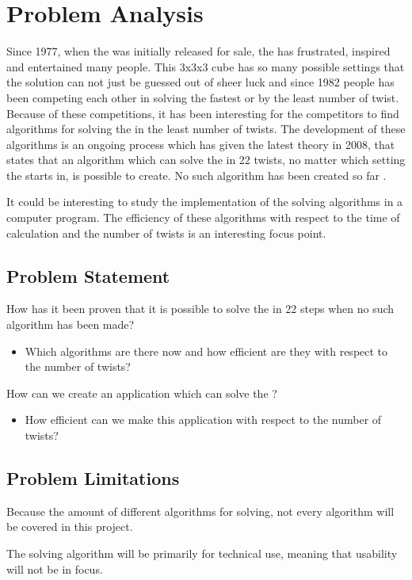 \chapter{Problem Analysis}
Since 1977, when the \rubik{} was initially released for sale, the \rubik{} has frustrated, inspired and entertained many people. This 3x3x3 cube has so many possible settings that the solution can not just be guessed out of sheer luck and since 1982 people has been competing each other in solving the \rubik{} fastest or by the least number of twist. Because of these competitions, it has been interesting for the competitors to find algorithms for solving the \rubik{} in the least number of twists. The development of these algorithms is an ongoing process which has given the latest theory in 2008, that states that an algorithm which can solve the \rubik{} in 22 twists, no matter which setting the \rubik{} starts in, is possible to create. No such algorithm has been created so far \cite{rokicki09}.

It could be interesting to study the implementation of the solving algorithms in a computer program. The efficiency of these algorithms with respect to the time of calculation and the number of twists is an interesting focus point.

\section{Problem Statement}
How has it been proven that it is possible to solve the \rubik{} in 22 steps when no such algorithm has been made?
\begin{itemize}
	\item Which algorithms are there now and how efficient are they with respect to the number of twists?
\end{itemize}
How can we create an application which can solve the \rubik{}?
\begin{itemize}
	\item How efficient can we make this application with respect to the number of twists?
\end{itemize}

\section{Problem Limitations}
Because the amount of different algorithms for \rubik{} solving, not every algorithm will be covered in this project.

The \rubik{} solving algorithm will be primarily for technical use, meaning that usability will not be in focus.
